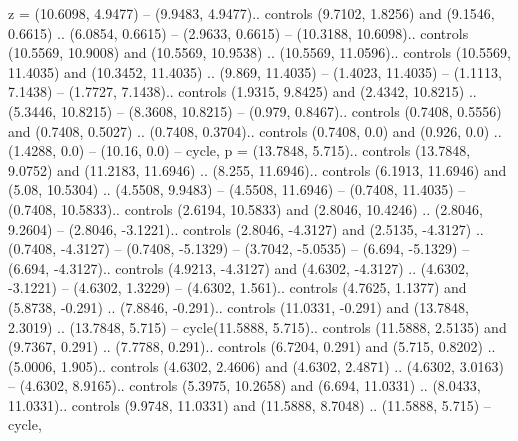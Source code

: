 {z} = {(10.6098, 4.9477) -- (9.9483, 4.9477).. controls (9.7102, 1.8256) and (9.1546, 0.6615) .. (6.0854, 0.6615) -- (2.9633, 0.6615) -- (10.3188, 10.6098).. controls (10.5569, 10.9008) and (10.5569, 10.9538) .. (10.5569, 11.0596).. controls (10.5569, 11.4035) and (10.3452, 11.4035) .. (9.869, 11.4035) -- (1.4023, 11.4035) -- (1.1113, 7.1438) -- (1.7727, 7.1438).. controls (1.9315, 9.8425) and (2.4342, 10.8215) .. (5.3446, 10.8215) -- (8.3608, 10.8215) -- (0.979, 0.8467).. controls (0.7408, 0.5556) and (0.7408, 0.5027) .. (0.7408, 0.3704).. controls (0.7408, 0.0) and (0.926, 0.0) .. (1.4288, 0.0) -- (10.16, 0.0) -- cycle},
{p} = {(13.7848, 5.715).. controls (13.7848, 9.0752) and (11.2183, 11.6946) .. (8.255, 11.6946).. controls (6.1913, 11.6946) and (5.08, 10.5304) .. (4.5508, 9.9483) -- (4.5508, 11.6946) -- (0.7408, 11.4035) -- (0.7408, 10.5833).. controls (2.6194, 10.5833) and (2.8046, 10.4246) .. (2.8046, 9.2604) -- (2.8046, -3.1221).. controls (2.8046, -4.3127) and (2.5135, -4.3127) .. (0.7408, -4.3127) -- (0.7408, -5.1329) -- (3.7042, -5.0535) -- (6.694, -5.1329) -- (6.694, -4.3127).. controls (4.9213, -4.3127) and (4.6302, -4.3127) .. (4.6302, -3.1221) -- (4.6302, 1.3229) -- (4.6302, 1.561).. controls (4.7625, 1.1377) and (5.8738, -0.291) .. (7.8846, -0.291).. controls (11.0331, -0.291) and (13.7848, 2.3019) .. (13.7848, 5.715) -- cycle(11.5888, 5.715).. controls (11.5888, 2.5135) and (9.7367, 0.291) .. (7.7788, 0.291).. controls (6.7204, 0.291) and (5.715, 0.8202) .. (5.0006, 1.905).. controls (4.6302, 2.4606) and (4.6302, 2.4871) .. (4.6302, 3.0163) -- (4.6302, 8.9165).. controls (5.3975, 10.2658) and (6.694, 11.0331) .. (8.0433, 11.0331).. controls (9.9748, 11.0331) and (11.5888, 8.7048) .. (11.5888, 5.715) -- cycle},
